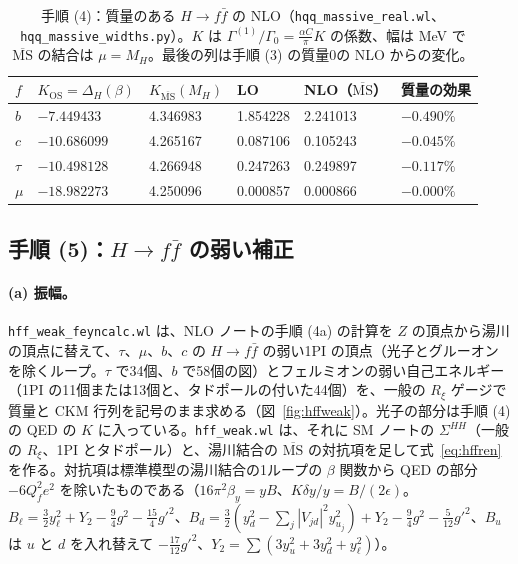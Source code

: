 \documentclass[a4paper,10pt]{ltjsarticle}
\newcommand{\MSbar}{\overline{\mathrm{MS}}}
\begin{document}
\begin{table}[tbp]
\centering\small
\caption{手順 (4)：質量のある $H\to f\bar f$ の NLO（\texttt{hqq\_massive\_real.wl}、\texttt{hqq\_massive\_widths.py}）。$K$ は $\Gamma^{(1)}/\Gamma_0=\frac{\alpha C}\pi K$ の係数、幅は MeV で $\MSbar$ の結合は $\mu=M_H$。最後の列は手順 (3) の質量0の NLO からの変化。}
\label{tab:hqqmass}
\begin{tabular}{llllll}
\toprule
$f$ & $K_{\mathrm{OS}}=\Delta_H(\beta)$ & $K_{\MSbar}(M_H)$ & LO & NLO（$\MSbar$） & 質量の効果 \\
\midrule
$b$ & $-7.449433$ & 4.346983 & 1.854228 & 2.241013 & $-0.490\%$ \\
$c$ & $-10.686099$ & 4.265167 & 0.087106 & 0.105243 & $-0.045\%$ \\
$\tau$ & $-10.498128$ & 4.266948 & 0.247263 & 0.249897 & $-0.117\%$ \\
$\mu$ & $-18.982273$ & 4.250096 & 0.000857 & 0.000866 & $-0.000\%$ \\
\bottomrule
\end{tabular}
\end{table}

\subsection{手順 (5)：$H\to f\bar f$ の弱い補正}\label{sec:step5}

\paragraph{(a) 振幅。}\texttt{hff\_weak\_feyncalc.wl} は、NLO ノートの手順 (4a) の計算を $Z$ の頂点から湯川の頂点に替えて、$\tau$、$\mu$、$b$、$c$ の $H\to f\bar f$ の弱い1PI の頂点（光子とグルーオンを除くループ。$\tau$ で34個、$b$ で58個の図）とフェルミオンの弱い自己エネルギー（1PI の11個または13個と、タドポールの付いた44個）を、一般の $R_\xi$ ゲージで質量と CKM 行列を記号のまま求める（図~\ref{fig:hffweak}）。光子の部分は手順 (4) の QED の $K$ に入っている。\texttt{hff\_weak.wl} は、それに SM ノートの $\Sigma^{HH}$（一般の $R_\xi$、1PI とタドポール）と、湯川結合の $\MSbar$ の対抗項を足して式~\eqref{eq:hffren} を作る。対抗項は標準模型の湯川結合の1ループの $\beta$ 関数から QED の部分 $-6Q_f^2e^2$ を除いたものである（$16\pi^2\beta_y=yB$、$K\delta y/y=B/(2\epsilon)$。$B_\ell=\frac32y_\ell^2+Y_2-\frac94g^2-\frac{15}4g'^2$、$B_d=\frac32(y_d^2-\sum_j|V_{jd}|^2y_{u_j}^2)+Y_2-\frac94g^2-\frac5{12}g'^2$、$B_u$ は $u$ と $d$ を入れ替えて $-\frac{17}{12}g'^2$、$Y_2=\sum(3y_u^2+3y_d^2+y_\ell^2)$）。
\end{document}
